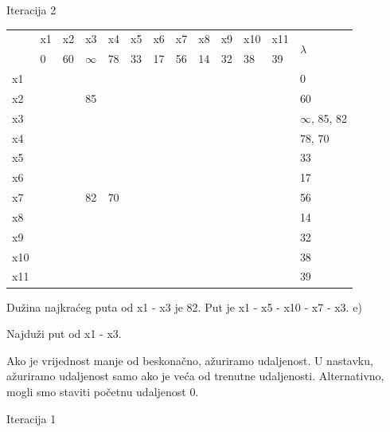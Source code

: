 \documentclass[12pt]{article}
\begin{document}
Iteracija 2
\begin{table}[hp]
\centering
\begin{tabular}{|l|l|l|l|l|l|l|l|l|l|l|l|l|}
\hline
\multirow{2}{*}{} & x1 & x2 & x3 & x4 & x5 & x6 & x7 & x8 & x9 & x10 & x11 & \multirow{2}{*}{$\lambda$} \\ \cline{2-12}
 & 0 & 60 & $\infty$ & 78 & 33 & 17 & 56 & 14 & 32 & 38 & 39 &  \\ \hline
x1 &  &  &  &  &  &  &  &  &  &  &  & 0 \\ \hline
x2 &  &  & 85 &  &  &  &  &  &  &  &  & 60 \\ \hline
x3 &  &  &  &  &  &  &  &  &  &  &  & $\infty$, 85, 82 \\ \hline
x4 &  &  &  &  &  &  &  &  &  &  &  & 78, 70 \\ \hline
x5 &  &  &  &  &  &  &  &  &  &  &  & 33 \\ \hline
x6 &  &  &  &  &  &  &  &  &  &  &  & 17 \\ \hline
x7 &  &  & 82 & 70 &  &  &  &  &  &  &  & 56 \\ \hline
x8 &  &  &  &  &  &  &  &  &  &  &  & 14 \\ \hline
x9 &  &  &  &  &  &  &  &  &  &  &  & 32 \\ \hline
x10 &  &  &  &  &  &  &  &  &  &  &  & 38 \\ \hline
x11 &  &  &  &  &  &  &  &  &  &  &  & 39 \\ \hline
\end{tabular}
\end{table}

Dužina najkraćeg puta od x1 - x3 je 82. Put je x1 - x5 - x10 - x7 - x3.
\newpage
e)

Najduži put od x1 - x3.

Ako je vrijednost manje od beskonačno, ažuriramo udaljenost. U nastavku, ažuriramo udaljenost samo ako je veća od trenutne udaljenosti. Alternativno, mogli smo staviti početnu udaljenost 0.

Iteracija 1
\end{document}
